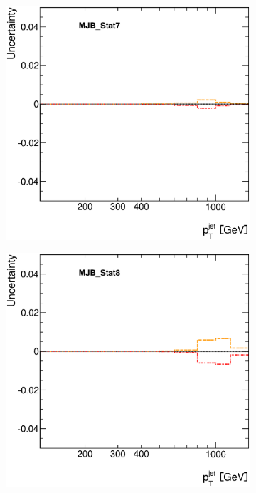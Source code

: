 \documentclass[12pt, twoside]{article}
\numberwithin{equation}{section}
\numberwithin{figure}{section}
\newenvironment{changemargin}[2]{%
\begin{list}{}{%
\setlength{\topsep}{0pt}%
\setlength{\leftmargin}{#1}%
\setlength{\rightmargin}{#2}%
\setlength{\listparindent}{\parindent}%
\setlength{\itemindent}{\parindent}%
\setlength{\parsep}{\parskip}%
}%
\item[]}{\end{list}}
\begin{document}
\begin{figure}[H]
\begin{changemargin}{-1.0cm}{-0.75cm}
\begin{changemargin}{-0.75cm}{-1.0cm}
        \begin{subfigure}[b]{0.25\textwidth}
            \includegraphics[width=\textwidth]{./images/JetSystematics/JetSystematic-33.eps}
        \end{subfigure}
        \begin{subfigure}[b]{0.25\textwidth}
            \includegraphics[width=\textwidth]{./images/JetSystematics/JetSystematic-34.eps}

\end{subfigure}
\end{changemargin}
\end{changemargin}
\end{figure}
\end{document}
